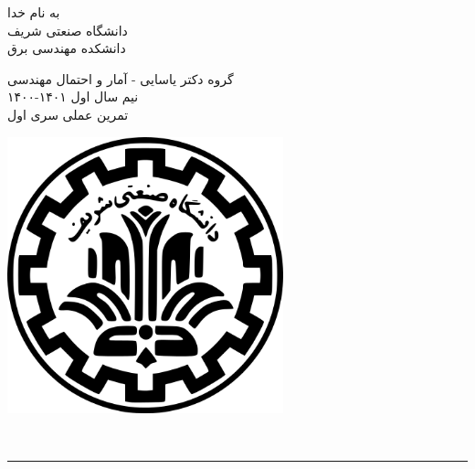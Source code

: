 \documentclass[a4paper]{article}
\begin{document}
\begin{minipage}{0.6\textwidth}
\begin{bf}
\begin{center}
	به نام خدا\\
	\vspace{0.25cm}
	دانشگاه صنعتی شریف\\
	\vspace{0.25cm}
	دانشکده مهندسی برق\\
	\vspace{0.5cm}

\large
گروه دکتر یاسایی - آمار و احتمال مهندسی \\
نیم سال اول
۱۴۰۱-۱۴۰۰\\
\Large
\vspace{0.4cm}
تمرین عملی سری اول\\
\end{center}
\end{bf}
\normalsize
\end{minipage} \hfill
\begin{minipage}{0.35\textwidth}
\begin{flushleft}
\includegraphics[width=0.6\textwidth]{Shariflogo.png}\\ \large
\end{flushleft}

 \end{minipage}
\\

\rule[0.1\baselineskip]{\textwidth}{1.5pt}

\large
\end{document}
